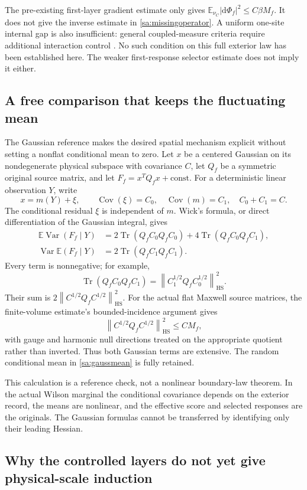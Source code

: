 \documentclass[11pt]{article}
\theoremstyle{definition}\newtheorem{definition}[theorem]{Definition}
\theoremstyle{remark}\newtheorem{remark}[theorem]{Remark}
\newcommand{\E}{\mathbb E}\newcommand{\Var}{\operatorname{Var}}
\newcommand{\Cov}{\operatorname{Cov}}\newcommand{\Tr}{\operatorname{Tr}}
\newcommand{\HS}{\mathrm{HS}}\newcommand{\supp}{\operatorname{supp}}
\newcommand{\dd}{\mathrm d}\newcommand{\id}{\mathrm{id}}
\newcommand{\norm}[1]{\left\lVert #1\right\rVert}
\begin{document}
The pre-existing first-layer gradient estimate only gives
$\E_{\nu_C}|\dd\Phi_f|^2\le C\beta M_f$. It does not give the inverse estimate in \eqref{sa:missingoperator}. A uniform one-site internal gap is also insufficient: general coupled-measure criteria require additional interaction control \cite{OttoReznikoff}. No such condition on this full exterior law has been established here. The weaker first-response selector estimate does not imply it either.

\subsection{A free comparison that keeps the fluctuating mean}

The Gaussian reference makes the desired spatial mechanism explicit without setting a nonflat conditional mean to zero. Let $x$ be a centered Gaussian on its nondegenerate physical subspace with covariance $C$, let $Q_f$ be a symmetric original source matrix, and let
$F_f=x^TQ_fx+\mathrm{const}$. For a deterministic linear observation $Y$, write
\[
 x=m(Y)+\xi,\qquad
 \Cov(\xi)=C_0,\quad \Cov(m)=C_1,\quad C_0+C_1=C.
\]
The conditional residual $\xi$ is independent of $m$. Wick's formula, or direct differentiation of the Gaussian integral, gives
\begin{align}
 \E\Var(F_f\mid Y)
 &=2\Tr(Q_fC_0Q_fC_0)+4\Tr(Q_fC_0Q_fC_1), \label{sa:gaussinternal}\\
 \Var\E(F_f\mid Y)
 &=2\Tr(Q_fC_1Q_fC_1). \label{sa:gaussmean}
\end{align}
Every term is nonnegative; for example,
\[
 \Tr(Q_fC_0Q_fC_1)=\norm{C_1^{1/2}Q_fC_0^{1/2}}_{\HS}^2.
\]
Their sum is $2\norm{C^{1/2}Q_fC^{1/2}}_{\HS}^2$.
For the actual flat Maxwell source matrices, the finite-volume estimate's bounded-incidence argument gives
\[
 \norm{C^{1/2}Q_fC^{1/2}}_{\HS}^2\le CM_f,
\]
with gauge and harmonic null directions treated on the appropriate quotient rather than inverted. Thus both Gaussian terms are extensive. The random conditional mean in \eqref{sa:gaussmean} is fully retained.

This calculation is a reference check, not a nonlinear boundary-law theorem. In the actual Wilson marginal the conditional covariance depends on the exterior record, the means are nonlinear, and the effective score and selected responses are the originals. The Gaussian formulas cannot be transferred by identifying only their leading Hessian.

\subsection{Why the controlled layers do not yet give physical-scale induction}
\end{document}
